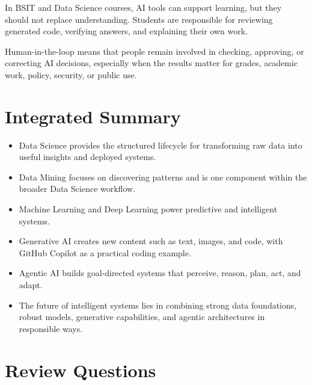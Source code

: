 \documentclass[11pt,a4paper]{article}
\begin{document}
\begin{alertbox}
In BSIT and Data Science courses, AI tools can support learning, but they should not replace understanding. Students are responsible for reviewing generated code, verifying answers, and explaining their own work.
\end{alertbox}

\begin{conceptbox}
Human-in-the-loop means that people remain involved in checking, approving, or correcting AI decisions, especially when the results matter for grades, academic work, policy, security, or public use.
\end{conceptbox}

\section{Integrated Summary}

\begin{itemize}[leftmargin=*]
  \item Data Science provides the structured lifecycle for transforming raw data into useful insights and deployed systems.
  \item Data Mining focuses on discovering patterns and is one component within the broader Data Science workflow.
  \item Machine Learning and Deep Learning power predictive and intelligent systems.
  \item Generative AI creates new content such as text, images, and code, with GitHub Copilot as a practical coding example.
  \item Agentic AI builds goal-directed systems that perceive, reason, plan, act, and adapt.
  \item The future of intelligent systems lies in combining strong data foundations, robust models, generative capabilities, and agentic architectures in responsible ways.
\end{itemize}

\section{Review Questions}
\end{document}
